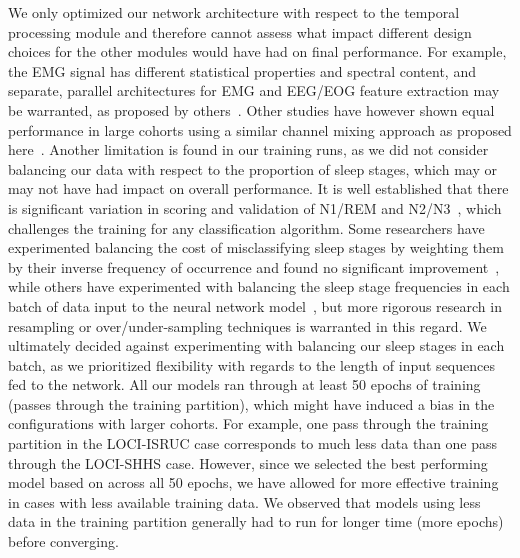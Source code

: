 We only optimized our network architecture with respect to the temporal processing module and therefore cannot assess what impact different design choices for the other modules would have had on final performance.
For example, the EMG signal has different statistical properties and spectral content, and separate, parallel architectures for EMG and EEG/EOG feature extraction may be warranted, as proposed by others~\cite{Chambon2018c, Stephansen2018}.
Other studies have however shown equal performance in large cohorts using a similar channel mixing approach as proposed here~\cite{Olesen2018c}.
Another limitation is found in our training runs, as we did not consider balancing our data with respect to the proportion of sleep stages, which may or may not have had impact on overall performance.
It is well established that there is significant variation in scoring and validation of N1/REM and N2/N3~\cite{Younes2016, Younes2018, Norman2000}, which challenges the training for any classification algorithm.
Some researchers have experimented balancing the cost of misclassifying sleep stages by weighting them by their inverse frequency of occurrence and found no significant improvement~\cite{Olesen2018c, Sors2018}, while others have experimented with balancing the sleep stage frequencies in each batch of data input to the neural network model~\cite{Chambon2018c}, but more rigorous research in resampling or over/under-sampling techniques is warranted in this regard.
We ultimately decided against experimenting with balancing our sleep stages in each batch, as we prioritized flexibility with regards to the length of input sequences fed to the network.
All our models ran through at least 50 epochs of training (passes through the training partition), which might have induced a bias in the configurations with larger cohorts.
For example, one pass through the training partition in the LOCI-ISRUC case corresponds to much less data than one pass through the LOCI-SHHS case.
However, since we selected the best performing model based on \cohen across all 50 epochs, we have allowed for more effective training in cases with less available training data.
We observed that models using less data in the training partition generally had to run for longer time (\ie more epochs) before converging.

